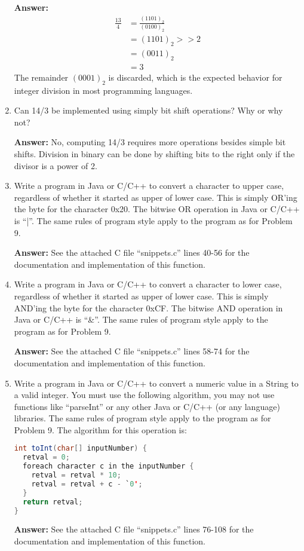 \documentclass[12pt]{article}
\begin{document}
\begin{enumerate}
    \textbf{Answer:}
    \begin{align*}
      \frac{13}{4} &= \frac{(1101)_2}{(0100)_2} \\
      &= (1101)_2 >> 2 \\
      &= (0011)_2 \\
      &= 3
    \end{align*}
    The remainder $(0001)_2$ is discarded, which is the expected behavior for integer division in most programming languages.

    \item Can 14/3 be implemented using simply bit shift operations? Why or why not?

    \textbf{Answer:}
    No, computing 14/3 requires more operations besides simple bit shifts. Division in binary can be done by shifting bits to the right only if the divisor is a power of 2.

    \item Write a program in Java or C/C++ to convert a character to upper case, regardless of whether it started as upper of lower case. This is simply OR’ing the byte for the character 0x20. The bitwise OR operation in Java or C/C++ is ``|''. The same rules of program style apply to the program as for Problem 9.

    \textbf{Answer:}
    See the attached C file ``snippets.c'' lines 40-56 for the documentation and implementation of this function.

    \item Write a program in Java or C/C++ to convert a character to lower case, regardless of whether it started as upper of lower case. This is simply AND’ing the byte for the character 0xCF. The bitwise AND operation in Java or C/C++ is ``\&''. The same rules of program style apply to the program as for Problem 9.

    \textbf{Answer:}
    See the attached C file ``snippets.c'' lines 58-74 for the documentation and implementation of this function.

    \item Write a program in Java or C/C++ to convert a numeric value in a String to a valid integer. You must use the following algorithm, you may not use functions like “parseInt” or any other Java or C/C++ (or any language) libraries. The same rules of program style apply to the program as for Problem 9. The algorithm for this operation is:

\begin{lstlisting}[language=Java, showstringspaces=false,]
int toInt(char[] inputNumber) {
  retval = 0;
  foreach character c in the inputNumber {
    retval = retval * 10;
    retval = retval + c - `0';
  }
  return retval;
}
\end{lstlisting}

    \textbf{Answer:}
    See the attached C file ``snippets.c'' lines 76-108 for the documentation and implementation of this function.

  \end{enumerate}
\end{document}

